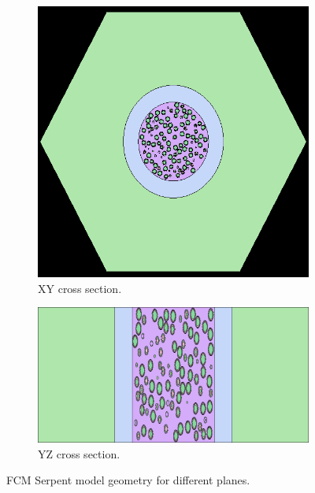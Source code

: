 \documentclass[11pt,letterpaper]{article}
\begin{document}
	\begin{figure}[]
		\centering
		\begin{subfigure}[t]{0.4\textwidth}
			\centering
			\includegraphics[width=\linewidth]{figures/FCM_geom1.png} 
			\caption{XY cross section.}
			\label{fig:FCM_xy}
		\end{subfigure}
		\begin{subfigure}[t]{0.4\textwidth}
			\centering
			\includegraphics[width=\linewidth]{figures/FCM_geom2.png}
			\caption{YZ cross section.}
			\label{fig:FCM_yz}
		\end{subfigure}
		\hfill
		\caption{FCM Serpent model geometry for different planes.}
		\label{fig:FCM}
	\end{figure}
\end{document}
